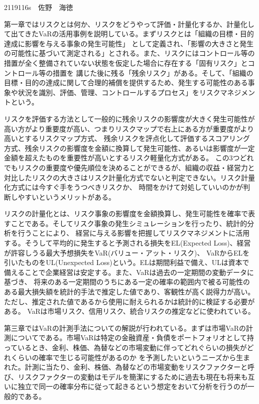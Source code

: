 \documentclass[12pt]{jsarticle}
\begin{document}
2119116s　佐野　海徳
\par 第一章ではリスクとは何か、リスクをどうやって評価・計量化するか、計量化して出てきたVaRの活用事例を説明している。まずリスクとは「組織の目標・目的達成に影響を与える事象の発生可能性」
として定義され、「影響の大きさと発生の可能性に基づいて測定される」とされる。また、リスクにはコントロール等の措置が全く整備されていない状態を仮定した場合に存在する「固有リスク」とコントロール等の措置を
講じた後に残る「残余リスク」がある。そして、「組織の目標・目的の達成に関して合理的補償を提供するため、発生する可能性のある事象や状況を識別、評価、管理、コントロールするプロセス」をリスクマネジメントという。
\par リスクを評価する方法として一般的に残余リスクの影響度が大きく発生可能性が高い方がより重要度が高い、つまりリスクマップで右上にある方が重要度がより高いとするリスクマップ方式、
残余リスクを評点化して評価するスコアリング方式、残余リスクの影響度を金額に換算して発生可能性、あるいは影響度が一定金額を超えたものを重要性が高いとするリスク軽量化方式がある。
この3つどれでもリスクの重要度や優先順位を決めることができるが、組織の収益・経営力と対比したリスクの大きさはリスク計量化方式でないと判定できない。リスク計量化方式には今すぐ手をうつべきリスクか、
時間をかけて対処していいのかが判断しやすいというメリットがある。
\par リスクの計量化とは、リスク事象の影響度を金額換算し、発生可能性を確率で表すことである。そしてリスク事象の発生シミュレーションを行ったり、統計的分析を行うことにより、
経営に与える影響を把握してリスクマネジメントに活用する。そうして平均的に発生すると予測される損失をEL(Expected Loss)、経営が許容しうる最大予想損失をVaR(バリュー・アット・リスク)、
VaRからELを引いたものをUL(Unexpected Loss)という。ELは期間利益で備え、ULは資本で備えることで企業経営は安定する。また、VaRは過去の一定期間の変動データに基づき、
将来のある一定期間のうちにある一定の確率の範囲内で被る可能性のある最大損失額を統計的手法で推定した値であり、客観性が高く説得力が高い。ただし、推定された値であるから使用に耐えられるかは統計的に検証する必要がある。
VaRは市場リスク、信用リスク、統合リスクの推定などに使われている。
\par 第三章ではVaRの計測手法についての解説が行われている。まずは市場VaRの計測についてである。市場VaRは特定の金融資産・負債をポートフォリオとして持っているとき、金利、株価、為替などの市場変動に伴ってどれぐらいの損失がどれくらいの確率で生じる可能性があるのか
を予測したいというニーズから生まれた。計測に当たり、金利、株価、為替などの市場変動をリスクファクターと呼び、リスクファクターの変動はモデルを簡潔にするために過去も現在も将来も互いに独立で同一の確率分布に従って起きるという想定をおいて分析を行うのが一般的である。
\end{document}
